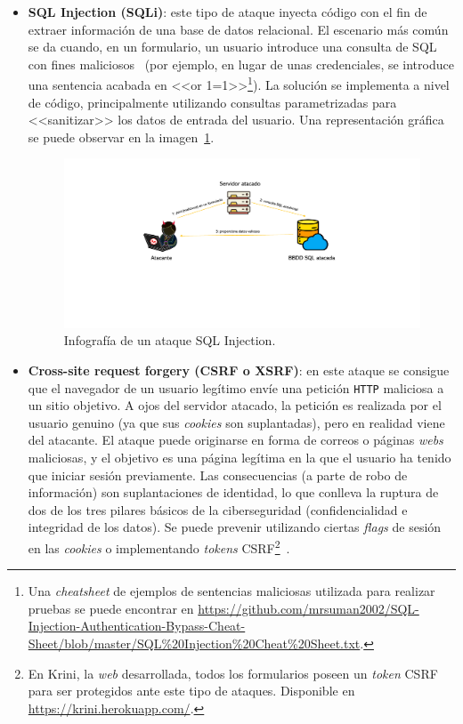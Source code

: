 \begin{itemize}
	\item \textbf{SQL Injection (SQLi)}: este tipo de ataque inyecta código con el fin de extraer información de una base de datos relacional. El escenario más común se da cuando, en un formulario, un usuario introduce una consulta de SQL con fines maliciosos~\cite{sqlIw3school} (por ejemplo, en lugar de unas credenciales, se introduce una sentencia acabada en <<or 1=1>>\footnote{Una \textit{cheatsheet} de ejemplos de sentencias maliciosas utilizada para realizar pruebas se puede encontrar en \url{https://github.com/mrsuman2002/SQL-Injection-Authentication-Bypass-Cheat-Sheet/blob/master/SQL\%20Injection\%20Cheat\%20Sheet.txt}.}). La solución se implementa a nivel de código, principalmente utilizando consultas parametrizadas para <<sanitizar>> los datos de entrada del usuario. Una representación gráfica se puede observar en la imagen~\ref{img:sqli}.
	
\begin{figure}[h]
	\caption[Ataques \textit{web}: SQLi]{Infografía de un ataque SQL Injection.}
	\label{img:sqli}
	\centering
	\includegraphics[width=\textwidth]{../img/memoria/3_sqli.pdf}
\end{figure}

	\item \textbf{Cross-site request forgery (CSRF o XSRF)}: en este ataque se consigue que el navegador de un usuario legítimo envíe una petición \texttt{HTTP} maliciosa a un sitio objetivo. A ojos del servidor atacado, la petición es realizada por el usuario genuino (ya que sus \textit{cookies} son suplantadas), pero en realidad viene del atacante. El ataque puede originarse en forma de correos o páginas \textit{webs} maliciosas, y el objetivo es una página legítima en la que el usuario ha tenido que iniciar sesión previamente. Las consecuencias (a parte de robo de información) son suplantaciones de identidad, lo que conlleva la ruptura de dos de los tres pilares básicos de la ciberseguridad (confidencialidad e integridad de los datos). Se puede prevenir utilizando ciertas \textit{flags} de sesión en las \textit{cookies} o implementando \textit{tokens} CSRF\footnote{En Krini, la \textit{web} desarrollada, todos los formularios poseen un \textit{token} CSRF para ser protegidos ante este tipo de ataques. Disponible en \url{https://krini.herokuapp.com/}.}~\cite{csrfatatus}.
	

\end{itemize}
